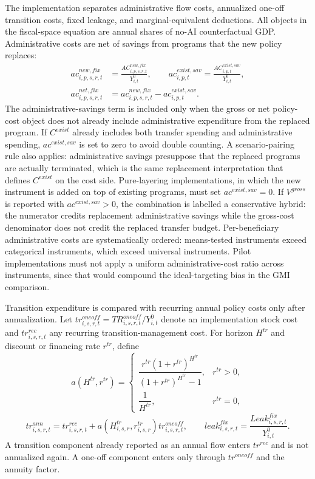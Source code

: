 \documentclass[11pt,a4paper]{article}
\begin{document}
The implementation separates administrative flow costs, annualized one-off transition costs, fixed leakage, and marginal-equivalent deductions. All objects in the fiscal-space equation are annual shares of no-AI counterfactual GDP. Administrative costs are net of savings from programs that the new policy replaces:
\begin{equation}\label{eq:admin_net_costs_v21}
\begin{split}
    ac^{new,fix}_{i,p,s,r,t}&=\frac{AC^{new,fix}_{i,p,s,r,t}}{Y^0_{i,t}},\qquad
    ac^{exist,sav}_{i,p,t}=\frac{AC^{exist,sav}_{i,p,t}}{Y^0_{i,t}},\\
    ac^{net,fix}_{i,p,s,r,t}&=ac^{new,fix}_{i,p,s,r,t}-ac^{exist,sav}_{i,p,t}.
\end{split}
\end{equation}
The administrative-savings term is included only when the gross or net policy-cost object does not already include administrative expenditure from the replaced program. If $C^{exist}$ already includes both transfer spending and administrative spending, $ac^{exist,sav}$ is set to zero to avoid double counting. A scenario-pairing rule also applies: administrative savings presuppose that the replaced programs are actually terminated, which is the same replacement interpretation that defines $C^{exist}$ on the cost side. Pure-layering implementations, in which the new instrument is added on top of existing programs, must set $ac^{exist,sav}=0$. If $V^{gross}$ is reported with $ac^{exist,sav}>0$, the combination is labelled a conservative hybrid: the numerator credits replacement administrative savings while the gross-cost denominator does not credit the replaced transfer budget.
Per-beneficiary administrative costs are systematically ordered: means-tested instruments exceed categorical instruments, which exceed universal instruments. Pilot implementations must not apply a uniform administrative-cost ratio across instruments, since that would compound the ideal-targeting bias in the GMI comparison.

Transition expenditure is compared with recurring annual policy costs only after annualization. Let $tr^{oneoff}_{i,s,r,t}=TR^{oneoff}_{i,s,r,t}/Y^0_{i,t}$ denote an implementation stock cost and $tr^{rec}_{i,s,r,t}$ any recurring transition-management cost. For horizon $H^{tr}$ and discount or financing rate $r^{tr}$, define
\begin{equation}\label{eq:transition_annualization_v21}
    a(H^{tr},r^{tr})=\begin{cases}
    \dfrac{r^{tr}(1+r^{tr})^{H^{tr}}}{(1+r^{tr})^{H^{tr}}-1}, & r^{tr}>0,\\[6pt]
    \dfrac{1}{H^{tr}}, & r^{tr}=0,
    \end{cases}
\end{equation}
\begin{equation}\label{eq:annualized_transition_v21}
    tr^{ann}_{i,s,r,t}=tr^{rec}_{i,s,r,t}+a(H^{tr}_{i,s,r},r^{tr}_{i,s,r})tr^{oneoff}_{i,s,r,t},
    \qquad
    leak^{fix}_{i,s,r,t}=\frac{Leak^{fix}_{i,s,r,t}}{Y^0_{i,t}}.
\end{equation}
A transition component already reported as an annual flow enters $tr^{rec}$ and is not annualized again. A one-off component enters only through $tr^{oneoff}$ and the annuity factor.
\end{document}
